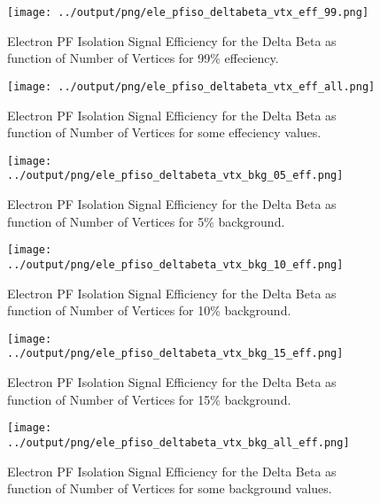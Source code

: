 \documentclass[11pt]{book}
\begin{document}
\begin{figure}[htb]
\centering
\texttt{[image: ../output/png/ele\_pfiso\_deltabeta\_vtx\_eff\_99.png]}
\caption{Electron PF Isolation Signal Efficiency for the Delta Beta as function of Number of Vertices for 99\% effeciency.}
\label{fig:ele_pfiso_vtx_eff_deltabeta_eff_99}
\end{figure}

\begin{figure}[htb]
\centering
\texttt{[image: ../output/png/ele\_pfiso\_deltabeta\_vtx\_eff\_all.png]}
\caption{Electron PF Isolation Signal Efficiency for the Delta Beta as function of Number of Vertices for some effeciency values.}
\label{fig:ele_pfiso_vtx_eff_deltabeta_eff_all}
\end{figure}

\begin{figure}[htb]
\centering
\texttt{[image: ../output/png/ele\_pfiso\_deltabeta\_vtx\_bkg\_05\_eff.png]}
\caption{Electron PF Isolation Signal Efficiency for the Delta Beta as function of Number of Vertices for 5\% background.}
\label{fig:ele_pfiso_vtx_eff_deltabeta_bkg_05_eff}
\end{figure}

\begin{figure}[htb]
\centering
\texttt{[image: ../output/png/ele\_pfiso\_deltabeta\_vtx\_bkg\_10\_eff.png]}
\caption{Electron PF Isolation Signal Efficiency for the Delta Beta as function of Number of Vertices for 10\% background.}
\label{fig:ele_pfiso_vtx_eff_deltabeta_bkg_10_eff}
\end{figure}

\begin{figure}[htb]
\centering
\texttt{[image: ../output/png/ele\_pfiso\_deltabeta\_vtx\_bkg\_15\_eff.png]}
\caption{Electron PF Isolation Signal Efficiency for the Delta Beta as function of Number of Vertices for 15\% background.}
\label{fig:ele_pfiso_vtx_eff_deltabeta_bkg_15_eff}
\end{figure}

\begin{figure}[htb]
\centering
\texttt{[image: ../output/png/ele\_pfiso\_deltabeta\_vtx\_bkg\_all\_eff.png]}
\caption{Electron PF Isolation Signal Efficiency for the Delta Beta as function of Number of Vertices for some background values.}
\label{fig:ele_pfiso_vtx_eff_deltabeta_bkg_all_eff}
\end{figure}
\clearpage
\end{document}
